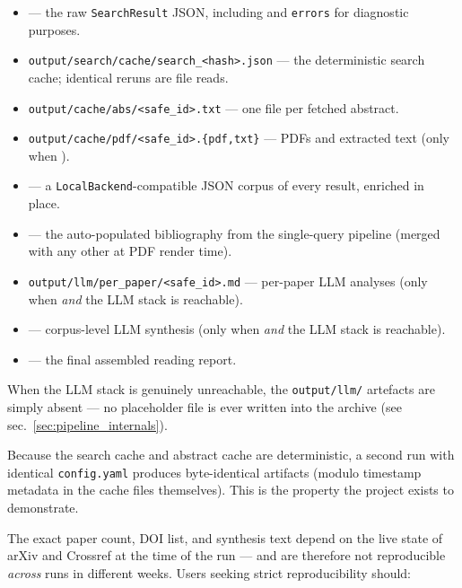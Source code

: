 \documentclass[
  english,
]{article}
\providecommand{\tightlist}{%
  \setlength{\itemsep}{0pt}\setlength{\parskip}{0pt}}
\begin{document}
\begin{itemize}
\tightlist
\item
   --- the raw \texttt{SearchResult}
  JSON, including  and \texttt{errors} for
  diagnostic purposes.
\item
  \texttt{output/search/cache/search\_\textless{}hash\textgreater{}.json}
  --- the deterministic search cache; identical reruns are file reads.
\item
  \texttt{output/cache/abs/\textless{}safe\_id\textgreater{}.txt} ---
  one file per fetched abstract.
\item
  \texttt{output/cache/pdf/\textless{}safe\_id\textgreater{}.\{pdf,txt\}}
  --- PDFs and extracted text (only when
  ).
\item
   --- a \texttt{LocalBackend}-compatible
  JSON corpus of every result, enriched in place.
\item
   --- the auto-populated bibliography
  from the single-query pipeline (merged with any other
   at PDF render time).
\item
  \texttt{output/llm/per\_paper/\textless{}safe\_id\textgreater{}.md}
  --- per-paper LLM analyses (only when 
  \emph{and} the LLM stack is reachable).
\item
   --- corpus-level LLM synthesis (only
  when  \emph{and} the LLM stack is
  reachable).
\item
   --- the final assembled reading
  report.
\end{itemize}

When the LLM stack is genuinely unreachable, the \texttt{output/llm/}
artefacts are simply absent --- no placeholder file is ever written into
the archive (see sec.~\ref{sec:pipeline_internals}).

Because the search cache and abstract cache are deterministic, a second
run with identical \texttt{config.yaml} produces byte-identical
artifacts (modulo timestamp metadata in the cache files themselves).
This is the property the project exists to demonstrate.

The exact paper count, DOI list, and synthesis text depend on the live
state of arXiv and Crossref at the time of the run --- and are therefore
not reproducible \emph{across} runs in different weeks. Users seeking
strict reproducibility should:
\end{document}
